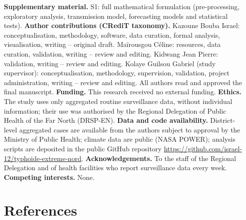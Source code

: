 \documentclass[11pt]{article}
\begin{document}
\textbf{Supplementary material.} S1: full mathematical formulation (pre-processing, exploratory analysis, transmission model, forecasting models and statistical tests).
\textbf{Author contributions (CRediT taxonomy).} Kazoune Bouba Israel: conceptualisation, methodology, software, data curation, formal analysis, visualisation, writing -- original draft. Maïrousgou Céline: resources, data curation, validation, writing -- review and editing. Kidwang Jean Pierre: validation, writing -- review and editing. Kolaye Guilsou Gabriel (study supervisor): conceptualisation, methodology, supervision, validation, project administration, writing -- review and editing. All authors read and approved the final manuscript.
\textbf{Funding.} This research received no external funding.
\textbf{Ethics.} The study uses only aggregated routine surveillance data, without individual information; their use was authorised by the Regional Delegation of Public Health of the Far North (DRSP-EN).
\textbf{Data and code availability.} District-level aggregated cases are available from the authors subject to approval by the Ministry of Public Health; climate data are public (NASA POWER); analysis scripts are deposited in the public GitHub repository \url{https://github.com/israel-12/typhoide-extreme-nord}.
\textbf{Acknowledgements.} To the staff of the Regional Delegation and of health facilities who report surveillance data every week.
\textbf{Competing interests.} None.

\section*{References}
\end{document}
